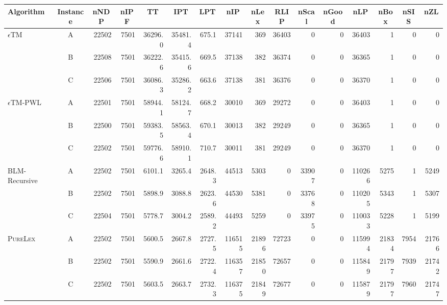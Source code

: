 \documentclass{article}
\begin{document}
\begin{table}[htb]
	\scriptsize
	\centering
	
	\setlength{\tabcolsep}{0.8pt}
	\begin{tabular}{l|c|rr|rrr|rrrrrr|rrr}
		
		\noalign{\smallskip}
		\firsthline
		\noalign{\smallskip}
		
		\textbf{Algorithm} & \textbf{Instance} & \multicolumn{1}{c}{\textbf{nNDP}} & \multicolumn{1}{c|}{\textbf{nIPF}} 
		
		& \multicolumn{1}{c}{\textbf{TT}} & \multicolumn{1}{c}{\textbf{IPT}} & \multicolumn{1}{c|}{\textbf{LPT}} &  \multicolumn{1}{c}{\textbf{nIP}} & \multicolumn{1}{c}{\textbf{nLex}} & \multicolumn{1}{c}{\textbf{RLIP}} & \multicolumn{1}{c}{\textbf{nScal}} & \multicolumn{1}{c}{\textbf{nGood}}
		
		& \multicolumn{1}{c|}{\textbf{nLP}} & \multicolumn{1}{c}{\textbf{nBox}} &  \multicolumn{1}{c}{\textbf{nSIS}} & \multicolumn{1}{c}{\textbf{nZL}}  \\ \hline
		
\hline
$\epsilon$TM & A & 22502 & 7501 & 36296.0 & 35481.4 & 675.1 &  37141 & 369 & 36403 & 0 & 0 & 36403 & 1 & 0 & 0 \\
& B & 22508 & 7501 & 36222.6 & 35415.6 & 669.5 &  37138 & 382 & 36374 & 0 & 0 & 36365 & 1 & 0 & 0 \\
& C & 22506 & 7501 & 36086.3 & 35286.2 & 663.6 &  37138 & 381 & 36376 & 0 & 0 & 36370 & 1 & 0 & 0 \\
\hline

$\epsilon$TM-PWL & A & 22501 & 7501 & 58944.1 & 58124.7 & 668.2 &  30010 & 369 & 29272 & 0 & 0 & 36403 & 1 & 0 & 0 \\
& B & 22500 & 7501 & 59383.5 & 58563.4 & 670.1 &  30013 & 382 & 29249 & 0 & 0 & 36365 & 1 & 0 & 0 \\
& C & 22502 & 7501 & 59776.6 & 58910.1 & 710.7 &  30011 & 381 & 29249 & 0 & 0 & 36370 & 1 & 0 & 0 \\

\hline
BLM-Recursive & A & 22502 & 7501 & 6101.1 & 3265.4 & 2648.3 &  44513 & 5303 & 0 & 33907 & 0 & 110266 & 5275 & 1 & 5249 \\
& B & 22502 & 7501 & 5898.9 & 3088.8 & 2623.6 &  44530 & 5381 & 0 & 33768 & 0 & 110205 & 5343 & 1 & 5307 \\
& C & 22504 & 7501 & 5778.7 & 3004.2 & 2589.2 &  44493 & 5259 & 0 & 33975 & 0 & 110033 & 5228 & 1 & 5199 \\

\hline
\textsc{PureLex} & A  & 22502 & 7501 & 5600.5 & 2667.8 & 2727.5 &  116515 & 21896 & 72723 & 0 & 0 & 115994 & 21834 & 7954 & 21766 \\
& B  & 22502 & 7501 & 5590.9 & 2661.6 & 2722.4 &  116357 & 21850 & 72657 & 0 & 0 & 115849 & 21797 & 7939 & 21742 \\
& C  & 22502 & 7501 & 5603.5 & 2663.7 & 2732.3 &  116375 & 21849 & 72677 & 0 & 0 & 115879 & 21797 & 7960 & 21747 \\


\end{tabular}
\end{table}
\end{document}
